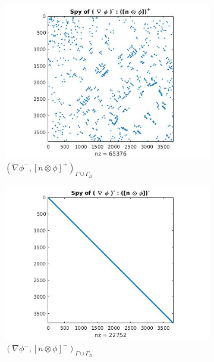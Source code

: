 \documentclass[a4paper,12pt]{book}
\begin{document}
\begin{figure}[H]
\begin{subfigure}{.5\textwidth}
  \includegraphics[width=\linewidth]{figure33.jpg}
  \caption{$( \nabla \phi^- ,[n \otimes \phi]^+)_{\Gamma \cup \Gamma_D}$}
  \label{fig:figure33}
\end{subfigure}
\begin{subfigure}{.5\textwidth}	
\centering
  \includegraphics[width=\linewidth]{figure34.jpg}
  \caption{$( \nabla \phi^- ,[n \otimes \phi]^-)_{\Gamma \cup \Gamma_D}$}
  \label{fig:figure34}
\end{subfigure}
\begin{subfigure}{\textwidth}	
\centering

\end{subfigure}
\end{figure}
\end{document}
